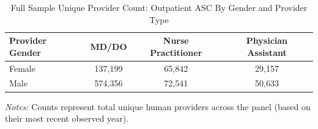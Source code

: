 \documentclass[12pt]{article}
\begin{document}
\thispagestyle{empty}
\vspace*{2cm}
\begin{table}[htbp]
    \centering
    \caption{Full Sample Unique Provider Count: Outpatient ASC By Gender and Provider Type}
    \vspace{0.2cm}
    \begin{tabular}{lccc}
        \toprule
        \textbf{Provider Gender} & \textbf{MD/DO} & \textbf{Nurse Practitioner} & \textbf{Physician Assistant} \\
        \midrule
        Female & 137,199 & 65,842 & 29,157 \\
        Male & 574,356 & 72,541 & 50,633 \\
        \bottomrule
    \end{tabular}
    \vspace{0.1cm}
    \begin{minipage}{0.6\textwidth}
        \footnotesize \textit{Notes:} Counts represent total unique human providers across the panel (based on their most recent observed year).
    \end{minipage}
\end{table}
\end{document}
